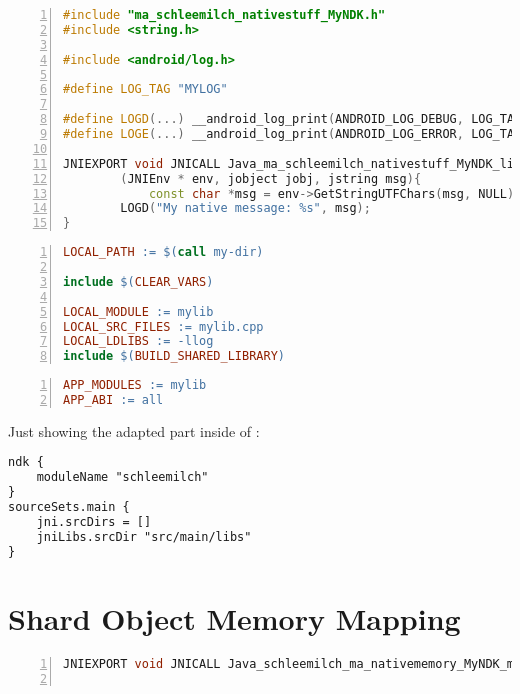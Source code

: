 \begin{appendices}
\begin{lstlisting}[language=C++, caption=mylib.cpp, label=nkd_sample_cpp, numbers=left]
#include "ma_schleemilch_nativestuff_MyNDK.h"
#include <string.h>

#include <android/log.h>

#define LOG_TAG "MYLOG"

#define LOGD(...) __android_log_print(ANDROID_LOG_DEBUG, LOG_TAG, __VA_ARGS__)
#define LOGE(...) __android_log_print(ANDROID_LOG_ERROR, LOG_TAG, __VA_ARGS__)

JNIEXPORT void JNICALL Java_ma_schleemilch_nativestuff_MyNDK_libExe
        (JNIEnv * env, jobject jobj, jstring msg){
        	const char *msg = env->GetStringUTFChars(msg, NULL);
        LOGD("My native message: %s", msg);
}
\end{lstlisting}

\begin{lstlisting}[language=make, caption=Android.mk, label=nkd_sample_make, numbers=left]
LOCAL_PATH := $(call my-dir)

include $(CLEAR_VARS)

LOCAL_MODULE := mylib
LOCAL_SRC_FILES := mylib.cpp
LOCAL_LDLIBS := -llog
include $(BUILD_SHARED_LIBRARY)
\end{lstlisting}

\begin{lstlisting}[language=make, caption=Application.mk, label=nkd_sample_app_make, numbers=left]
APP_MODULES := mylib
APP_ABI := all
\end{lstlisting}

Just showing the adapted part inside of :
\begin{lstlisting}[language=xml, caption=build.gradle, label=nkd_sample_gradle]
ndk {
	moduleName "schleemilch"
}
sourceSets.main {
	jni.srcDirs = []
	jniLibs.srcDir "src/main/libs"
}
\end{lstlisting}



\chapter{Shard Object Memory Mapping}\label{chapter:so_mem_mapping}

\begin{lstlisting}[language=C++, caption=File Mapping with malloc(), label=file_mapping_malloc, numbers=left]
JNIEXPORT void JNICALL Java_schleemilch_ma_nativememory_MyNDK_mallocFile(JNIEnv *env, jobject obj, jstring inpath){


\end{lstlisting}
\end{appendices}
